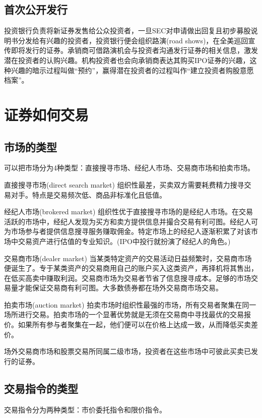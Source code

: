 \documentclass{article}
\begin{document}
\subsection{首次公开发行}
投资银行负责将新证券发售给公众投资者，一旦SEC对申请做出回复且初步募股说明书分发给有兴趣的投资者，投资银行便会组织路演(road shows)，在全美巡回宣传即将发行的证券。承销商可借路演机会与投资者沟通发行证券的相关信息，激发潜在投资者的认购兴趣。机构投资者也会向承销商表达其购买IPO证券的兴趣，这种兴趣的暗示过程叫做“预约”，赢得潜在投资者的过程叫作“建立投资者购股意愿档案”。

\section{证券如何交易}
\subsection{市场的类型}
可以把市场分为4种类型：直接搜寻市场、经纪人市场、交易商市场和拍卖市场。

直接搜寻市场(direct search market) 组织性最差，买卖双方需要耗费精力搜寻交易对手。特点是交易频次低、商品非标准化且低值。

经纪人市场(brokered market) 组织性优于直接搜寻市场的是经纪人市场。在交易活跃的市场中，经纪人发现为买方和卖方提供信息并撮合交易有利可图。经纪人可为市场参与者提供信息搜寻服务赚取佣金。特定市场上的经纪人逐渐积累了对该市场中交易资产进行估值的专业知识。(IPO中投行就扮演了经纪人的角色。)

交易商市场(dealer market) 当某类特定资产的交易活动日益频繁时，交易商市场便诞生了。专于某类资产的交易商用自己的账户买入这类资产，再择机将其售出，在低买高卖中赚取利润。交易商市场为交易者节省了信息搜寻成本。足够的市场交易量才能保证交易商有利可图。大多数债券都在场外交易商市场交易。

拍卖市场(auction market) 拍卖市场时组织性最强的市场，所有交易者聚集在同一场所进行交易。拍卖市场的一个显著优势就是无须在交易商中寻找最优的交易报价。如果所有参与者聚集在一起，他们便可以在价格上达成一致，从而降低买卖差价。

\hspace*{\fill}

场外交易商市场和股票交易所同属二级市场，投资者在这些市场中可彼此买卖已发行的证券。

\subsection{交易指令的类型}
交易指令分为两种类型：市价委托指令和限价指令。
\end{document}
